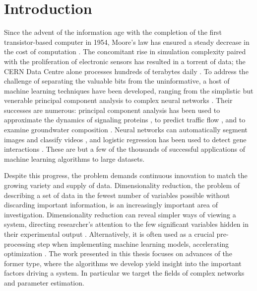 \chapter{Introduction\label{ch:intro}}

Since the advent of the information age with the completion of the
first transistor-based computer in 1954, Moore's law has ensured a
steady decrease in the cost of computation
\cite{schaller_moores_1997}. The concomitant rise in simulation
complexity paired with the proliferation of electronic sensors has
resulted in a torrent of data; the CERN Data Centre alone processes
hundreds of terabytes daily \cite{britton_how_2014}. To address the
challenge of separating the valuable bits from the uninformative, a
host of machine learning techniques have been developed, ranging from
the simplistic but venerable principal component analysis to complex
neural networks
\cite{hotelling_analysis_1933,lecun_handbook_1998,tenenbaum_global_2000,coifman_diffusion_2006}. Their
successes are numerous: principal component analysis has been used to
approximate the dynamics of signaling proteins
\cite{goyal_parallel_2017}, to predict traffic flow
\cite{zhang_forecasting_2007}, and to examine groundwater composition
\cite{helena_temporal_2000}. Neural networks can automatically segment
images and classify videos
\cite{karpathy_large-scale_2014,zheng_conditional_2015}, and logistic
regression has been used to detect gene interactions
\cite{park_penalized_2008}. These are but a few of the thousands of
successful applications of machine learning algorithms to large
datasets.

Despite this progress, the problem demands continuous innovation to
match the growing variety and supply of data. Dimensionality
reduction, the problem of describing a set of data in the fewest
number of variables possible without discarding important information,
is an increasingly important area of investigation. Dimensionality
reduction can reveal simpler ways of viewing a system, directing
researcher's attention to the few significant variables hidden in
their experimental output \cite{ferguson_systematic_2010}. Alternatively,
it is often used as a crucial pre-processing step when implementing
machine learning models, accelerating optimization \cite{xu_truncated_1998,buhler_efficient_2001}. The
work presented in this thesis focuses on advances of the former type,
where the algorithms we develop yield insight into the important
factors driving a system. In particular we target the fields of
complex networks and parameter estimation.

